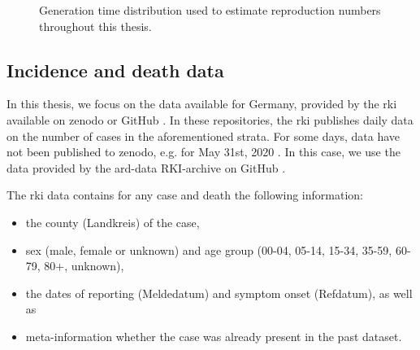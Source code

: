 \begin{figure}
    \resizebox{\textwidth}{!}{%
    }
    \caption{Generation time distribution used to estimate reproduction numbers throughout this thesis.}
    \label{fig:generation_time}
\end{figure}

\subsection{Incidence and death data}
In this thesis, we focus on the data available for Germany, provided by the \acrshort{rki} available on zenodo \citep{RobertKoch-Institut2024SARSCoV2} or GitHub \citep{RobertKoch-Institut2024SARSCoV2a}. In these repositories, the \acrshort{rki} publishes daily data on the number of cases in the aforementioned strata. For some days, data have not been published to zenodo, e.g. for May 31st, 2020 . In this case, we use the data provided by the ard-data RKI-archive on GitHub \citep{MichaelKreil2022RKICoronaDatenArchiv}. 

The \acrshort{rki} data contains for any case and death the following information:
\begin{itemize}
    \item the county (Landkreis) of the case,
    \item sex (male, female or unknown) and age group (00-04, 05-14, 15-34, 35-59, 60-79, 80+, unknown),
    \item the dates of reporting (Meldedatum) and symptom onset (Refdatum), as well as
    \item meta-information whether the case was already present in the past dataset.
\end{itemize}

